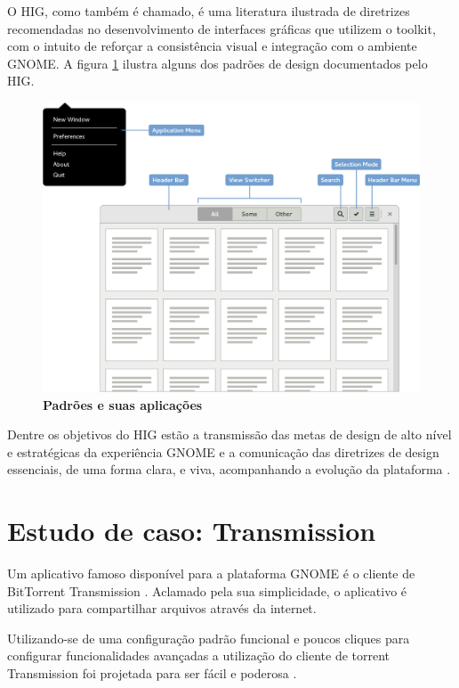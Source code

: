 O HIG, como também é chamado, é uma literatura ilustrada de diretrizes
recomendadas no desenvolvimento de interfaces gráficas que utilizem o toolkit,
com o intuito de reforçar a consistência visual e integração com o ambiente
GNOME. A figura \ref{gnome-hig-patterns} ilustra alguns dos padrões de design
documentados pelo HIG.

\begin{figure}[h!]
  \begin{center}
    \caption{\textbf{Padrões e suas aplicações}}
    \label{gnome-hig-patterns}
    \includegraphics[width=\textwidth]{image/hig/patterns.eps}
  \end{center}
\end{figure}

Dentre os objetivos do HIG estão a transmissão das metas de design de alto nível
e estratégicas da experiência GNOME e a comunicação das diretrizes de design
essenciais, de uma forma clara, e viva, acompanhando a evolução da plataforma
.

\section{Estudo de caso: Transmission}

Um aplicativo famoso disponível para a plataforma GNOME é o cliente de
BitTorrent Transmission \cite{transmission282}. Aclamado pela sua simplicidade,
o aplicativo é utilizado para compartilhar arquivos através da internet.

Utilizando-se de uma configuração padrão funcional e poucos cliques para
configurar funcionalidades avançadas a utilização do cliente de torrent
Transmission foi projetada para ser fácil e poderosa
\cite{transmission-about}.

